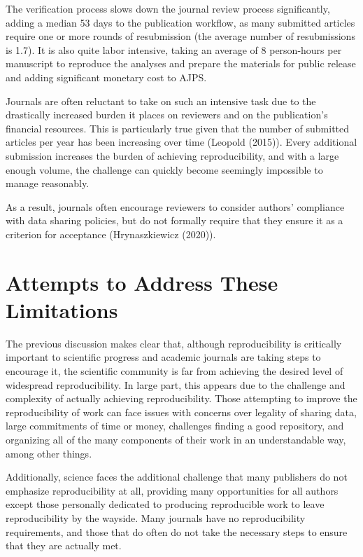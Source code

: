 \documentclass[12pt,twoside]{reedthesis}
\begin{document}
The verification process slows down the journal review process significantly, adding a median 53 days to the publication workflow, as many submitted articles require one or more rounds of resubmission (the average number of resubmissions is 1.7). It is also quite labor intensive, taking an average of 8 person-hours per manuscript to reproduce the analyses and prepare the materials for public release and adding significant monetary cost to AJPS.

Journals are often reluctant to take on such an intensive task due to the drastically increased burden it places on reviewers and on the publication's financial resources. This is particularly true given that the number of submitted articles per year has been increasing over time (Leopold (2015)). Every additional submission increases the burden of achieving reproducibility, and with a large enough volume, the challenge can quickly become seemingly impossible to manage reasonably.

As a result, journals often encourage reviewers to consider authors' compliance with data sharing policies, but do not formally require that they ensure it as a criterion for acceptance (Hrynaszkiewicz (2020)).

\hypertarget{attempts-to-address-these-limitations}{%
\section{Attempts to Address These Limitations}\label{attempts-to-address-these-limitations}}

The previous discussion makes clear that, although reproducibility is critically important to scientific progress and academic journals are taking steps to encourage it, the scientific community is far from achieving the desired level of widespread reproducibility. In large part, this appears due to the challenge and complexity of actually achieving reproducibility. Those attempting to improve the reproducibility of work can face issues with concerns over legality of sharing data, large commitments of time or money, challenges finding a good repository, and organizing all of the many components of their work in an understandable way, among other things.

Additionally, science faces the additional challenge that many publishers do not emphasize reproducibility at all, providing many opportunities for all authors except those personally dedicated to producing reproducible work to leave reproducibility by the wayside. Many journals have no reproducibility requirements, and those that do often do not take the necessary steps to ensure that they are actually met.
\end{document}
